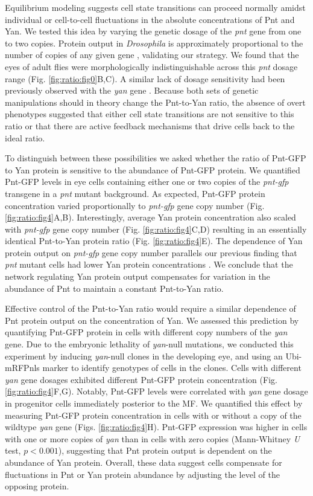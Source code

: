 Equilibrium modeling suggests cell state transitions can proceed normally amidst individual or cell-to-cell fluctuations in the absolute concentrations of Pnt and Yan. We tested this idea by varying the genetic dosage of the \textit{pnt} gene from one to two copies. Protein output in \textit{Drosophila} is approximately proportional to the number of copies of any given gene \cite{Lucchesi1973}, validating our strategy. We found that the eyes of adult flies were morphologically indistinguishable across this \textit{pnt} dosage range (Fig. \ref{fig:ratio:fig0}B,C). A similar lack of dosage sensitivity had been previously observed with the \textit{yan} gene \cite{Pelaez2015a}. Because both sets of genetic manipulations should in theory change the Pnt-to-Yan ratio, the absence of overt phenotypes suggested that either cell state transitions are not sensitive to this ratio or that there are active feedback mechanisms that drive cells back to the ideal ratio.

To distinguish between these possibilities we asked whether the ratio of Pnt-GFP to Yan protein is sensitive to the abundance of Pnt-GFP protein. We quantified Pnt-GFP levels in eye cells containing either one or two copies of the \textit{pnt-gfp} transgene in a \textit{pnt} mutant background. As expected, Pnt-GFP protein concentration varied proportionally to \textit{pnt-gfp} gene copy number (Fig. \ref{fig:ratio:fig4}A,B). Interestingly, average Yan protein concentration also scaled with \textit{pnt-gfp} gene copy number (Fig. \ref{fig:ratio:fig4}C,D) resulting in an essentially identical Pnt-to-Yan protein ratio (Fig. \ref{fig:ratio:fig4}E). The dependence of Yan protein output on \textit{pnt-gfp} gene copy number parallels our previous finding that \textit{pnt} mutant cells had lower Yan protein concentrations \cite{Pelaez2015a}. We conclude that the network regulating Yan protein output compensates for variation in the abundance of Pnt to maintain a constant Pnt-to-Yan ratio.

Effective control of the Pnt-to-Yan ratio would require a similar dependence of Pnt protein output on the concentration of Yan. We assessed this prediction by quantifying Pnt-GFP protein in cells with different copy numbers of the \textit{yan} gene. Due to the embryonic lethality of \textit{yan}-null mutations, we conducted this experiment by inducing \textit{yan}-null clones in the developing eye, and using an Ubi-mRFPnls marker to identify genotypes of cells in the clones. Cells with different \textit{yan} gene dosages exhibited different Pnt-GFP protein concentration (Fig. \ref{fig:ratio:fig4}F,G). Notably, Pnt-GFP levels were correlated with \textit{yan} gene dosage in progenitor cells immediately posterior to the MF. We quantified this effect by measuring Pnt-GFP protein concentration in cells with or without a copy of the wildtype \textit{yan} gene (Figs. \ref{fig:ratio:fig4}H). Pnt-GFP expression was higher in cells with one or more copies of \textit{yan} than in cells with zero copies (Mann-Whitney \textit{U} test, $p<0.001$), suggesting that Pnt protein output is dependent on the abundance of Yan protein. Overall, these data suggest cells compensate for fluctuations in Pnt or Yan protein abundance by adjusting the level of the opposing protein. 

